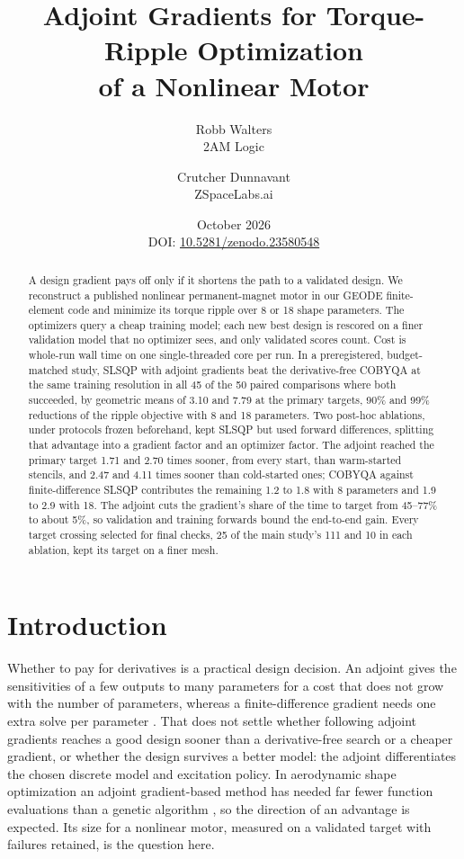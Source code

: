 \documentclass{anvil-paper}
\title{Adjoint Gradients for Torque-Ripple Optimization\\of a Nonlinear Motor}
\author{Robb Walters\\
  {\normalsize 2AM Logic}
  \and Crutcher Dunnavant\\
  {\normalsize ZSpaceLabs.ai}}
\date{October 2026\\[0.5ex]
  {\normalsize DOI: \href{https://doi.org/10.5281/zenodo.23580548}{10.5281/zenodo.23580548}}}
\begin{document}
\maketitle
\begin{abstract}
A design gradient pays off only if it shortens the path to a validated
design. We reconstruct a published nonlinear
permanent-magnet motor in our GEODE finite-element code and minimize its
torque ripple over 8 or 18 shape parameters. The optimizers query a cheap
training model; each new best design is rescored on a finer validation
model that no optimizer sees, and only validated scores count. Cost is
whole-run wall time on one single-threaded core per run. In a
preregistered, budget-matched study, SLSQP with adjoint gradients beat the
derivative-free COBYQA at the same training resolution in all 45 of the 50
paired comparisons where both succeeded, by geometric means of 3.10 and
7.79 at the primary targets, 90\% and 99\% reductions of the ripple
objective with 8 and 18 parameters. Two post-hoc ablations, under
protocols frozen beforehand, kept SLSQP but used forward differences,
splitting that advantage into a gradient factor and an optimizer factor.
The adjoint reached the primary target 1.71 and 2.70 times sooner, from
every start, than warm-started stencils, and 2.47 and 4.11 times sooner
than cold-started ones; COBYQA against
finite-difference SLSQP contributes the remaining 1.2 to 1.8 with 8
parameters and 1.9 to 2.9 with 18. The adjoint cuts the gradient's share
of the time to target from 45--77\% to about 5\%, so validation and
training forwards bound the end-to-end gain. Every target crossing
selected for final checks, 25 of the main study's 111 and 10 in each
ablation, kept its target on a finer mesh.
\end{abstract}

\section{Introduction}
Whether to pay for derivatives is a practical design decision. An adjoint
gives the sensitivities of a few outputs to many parameters for a cost
that does not grow with the number of parameters, whereas a
finite-difference gradient needs one extra solve per parameter
\citep{giles2000introduction,martins2013review}. That does not settle
whether following adjoint gradients reaches a good design sooner than a
derivative-free search or a cheaper gradient, or whether the design
survives a better model: the adjoint differentiates the chosen discrete
model and excitation policy. In aerodynamic shape optimization an adjoint
gradient-based method has needed far fewer function evaluations than a
genetic algorithm \citep{zingg2008comparative}, so the direction of an
advantage is expected. Its size for a nonlinear motor, measured on a
validated target with failures retained, is the question here.
\end{document}
